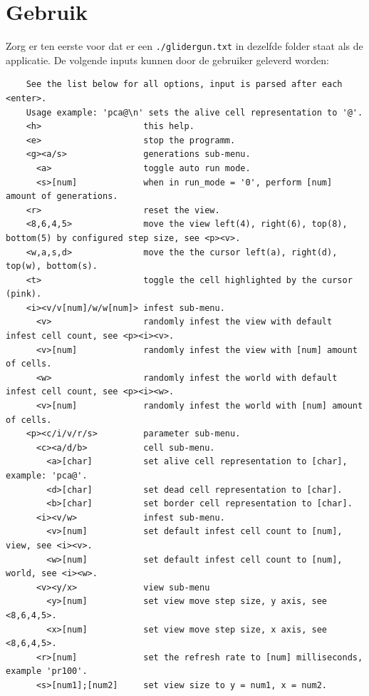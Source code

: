\documentclass[10pt]{article}
\begin{document}
\section{Gebruik}
Zorg er ten eerste voor dat er een \verb|./glidergun.txt| in dezelfde folder staat als de applicatie. De volgende
inputs kunnen door de gebruiker geleverd worden:
\begin{small}
    \begin{verbatim}
    See the list below for all options, input is parsed after each <enter>.
    Usage example: 'pca@\n' sets the alive cell representation to '@'.
    <h>                    this help.
    <e>                    stop the programm.
    <g><a/s>               generations sub-menu.
      <a>                  toggle auto run mode.
      <s>[num]             when in run_mode = '0', perform [num] amount of generations.
    <r>                    reset the view.
    <8,6,4,5>              move the view left(4), right(6), top(8), bottom(5) by configured step size, see <p><v>.
    <w,a,s,d>              move the the cursor left(a), right(d), top(w), bottom(s).
    <t>                    toggle the cell highlighted by the cursor (pink).
    <i><v/v[num]/w/w[num]> infest sub-menu.
      <v>                  randomly infest the view with default infest cell count, see <p><i><v>.
      <v>[num]             randomly infest the view with [num] amount of cells.
      <w>                  randomly infest the world with default infest cell count, see <p><i><w>.
      <v>[num]             randomly infest the world with [num] amount of cells.
    <p><c/i/v/r/s>         parameter sub-menu.
      <c><a/d/b>           cell sub-menu.
        <a>[char]          set alive cell representation to [char], example: 'pca@'.
        <d>[char]          set dead cell representation to [char].
        <b>[char]          set border cell representation to [char].
      <i><v/w>             infest sub-menu.
        <v>[num]           set default infest cell count to [num], view, see <i><v>.
        <w>[num]           set default infest cell count to [num], world, see <i><w>.
      <v><y/x>             view sub-menu
        <y>[num]           set view move step size, y axis, see <8,6,4,5>.
        <x>[num]           set view move step size, x axis, see <8,6,4,5>.
      <r>[num]             set the refresh rate to [num] milliseconds, example 'pr100'.
      <s>[num1];[num2]     set view size to y = num1, x = num2.
\end{verbatim}
\end{small}
\end{document}
